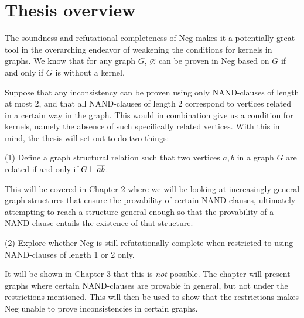 \section{Thesis overview}
\label{sec:Thesis overview}
The soundness and refutational completeness of Neg makes it a potentially great tool in the overarching endeavor of weakening the conditions for kernels in graphs.
We know that for any graph $G$, $\varnothing$ can be proven in Neg based on $G$ if and only if $G$ is without a kernel.

Suppose that any inconsistency can be proven using only NAND-clauses of length at most 2, and that all NAND-clauses of length 2 correspond to vertices related in a certain way in the graph.
This would in combination give us a condition for kernels, namely the absence of such specifically related vertices.
With this in mind, the thesis will set out to do two things:

(1) Define a graph structural relation such that two vertices $a,b$ in a graph $G$ are related if and only if $G \vdash \ol{ab}$.

This will be covered in Chapter 2 where we will be looking at increasingly general graph structures that ensure the provability of certain NAND-clauses, ultimately attempting to reach a structure general enough so that the provability of a NAND-clause entails the existence of that structure.

(2) Explore whether Neg is still refutationally complete when restricted to using NAND-clauses of length 1 or 2 only.

It will be shown in Chapter 3 that this is \textit{not} possible.
The chapter will present graphs where certain NAND-clauses are provable in general, but not under the restrictions mentioned.
This will then be used to show that the restrictions makes Neg unable to prove inconsistencies in certain graphs.
